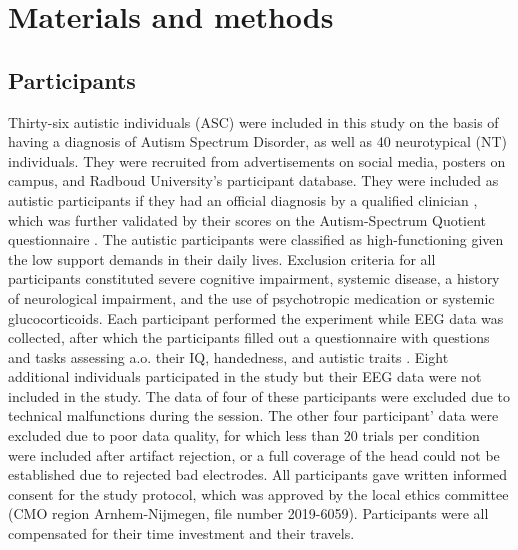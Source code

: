 \section{Materials and methods}

\subsection{Participants}
Thirty-six autistic individuals (ASC) were included in this study on the basis of having a diagnosis of Autism Spectrum Disorder, as well as 40 neurotypical (NT) individuals. They were recruited from advertisements on social media, posters on campus, and Radboud University's participant database. They were included as autistic participants if they had an official diagnosis by a qualified clinician \citep{apa2013}, which was further validated by their scores on the Autism-Spectrum Quotient questionnaire \citep[AQ]{baron-cohen2001AQ}. The autistic participants were classified as high-functioning given the low support demands in their daily lives. Exclusion criteria for all participants constituted severe cognitive impairment, systemic disease, a history of neurological impairment, and the use of psychotropic medication or systemic glucocorticoids. Each participant performed the experiment while EEG data was collected, after which the participants filled out a questionnaire with questions and tasks assessing a.o. their IQ, handedness, and autistic traits \citep{baron-cohen2001AQ,raven1989,veale2014}. Eight additional individuals participated in the study but their EEG data were not included in the study. The data of four of these participants were excluded due to technical malfunctions during the session. The other four participant' data were excluded due to poor data quality, for which less than 20 trials per condition were included after artifact rejection, or a full coverage of the head could not be established due to rejected bad electrodes. All participants gave written informed consent for the study protocol, which was approved by the local ethics committee (CMO region Arnhem-Nijmegen, file number 2019-6059). Participants were all compensated for their time investment and their travels.

